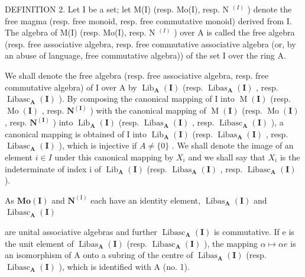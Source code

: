 DEFINITION 2. Let I be a set; let M(I) (resp. Mo(I), resp. N \(^{(I)}\) ) denote the free magma (resp. free monoid, resp. free commutative monoid) derived from I. The algebra of M(I) (resp. Mo(I), resp. N \(^{(I)}\) ) over A is called the free algebra (resp. free associative algebra, resp. free commutative associative algebra (or, by an abuse of language, free commutative algebra)) of the set I over the ring A.

We shall denote the free algebra (resp. free associative algebra, resp. free commutative algebra) of I over A by \(\operatorname{Lib}_{\mathbf{A}}(\mathbf{I})\) (resp. \(\operatorname{Libas}_{\mathbf{A}}(\mathbf{I})\) , resp. \(\operatorname{Libasc}_{\mathbf{A}}(\mathbf{I})\) ). By composing the canonical mapping of I into \(\operatorname{M}(\mathbf{I})\) (resp. \(\operatorname{Mo}(\mathbf{I})\) , resp. \(\mathbf{N}^{(\mathbf{I})}\) ) with the canonical mapping of \(\operatorname{M}(\mathbf{I})\) (resp. \(\operatorname{Mo}(\mathbf{I})\) , resp. \(\mathbf{N}^{(\mathbf{I})}\) ) into \(\operatorname{Lib}_{\mathbf{A}}(\mathbf{I})\) (resp. \(\operatorname{Libas}_{\mathbf{A}}(\mathbf{I})\) , resp. \(\operatorname{Libasc}_{\mathbf{A}}(\mathbf{I})\) ), a canonical mapping is obtained of I into \(\operatorname{Lib}_{\mathbf{A}}(\mathbf{I})\) (resp. \(\operatorname{Libas}_{\mathbf{A}}(\mathbf{I})\) , resp. \(\operatorname{Libasc}_{\mathbf{A}}(\mathbf{I})\) ), which is injective if \(A \neq \{0\}\) . We shall denote the image of an element \(i \in I\) under this canonical mapping by \(X_{i}\) and we shall say that \(X_{i}\) is the indeterminate of index i of \(\operatorname{Lib}_{\mathbf{A}}(\mathbf{I})\) (resp. \(\operatorname{Libas}_{\mathbf{A}}(\mathbf{I})\) , resp. \(\operatorname{Libasc}_{\mathbf{A}}(\mathbf{I})\) ).

As \(\mathbf{Mo}(\mathbf{I})\) and \(\mathbf{N}^{(\mathrm{I})}\) each have an identity element, \(\operatorname{Libas}_{\mathbf{A}}(\mathbf{I})\) and \(\operatorname{Libasc}_{\mathbf{A}}(\mathbf{I})\)

are unital associative algebras and further \(\operatorname{Libasc}_{\mathbf{A}}(\mathbf{I})\) is commutative. If e is the unit element of \(\operatorname{Libas}_{\mathbf{A}}(\mathbf{I})\) (resp. \(\operatorname{Libasc}_{\mathbf{A}}(\mathbf{I})\) ), the mapping \(\alpha \mapsto \alpha e\) is an isomorphism of A onto a subring of the centre of \(\operatorname{Libas}_{\mathbf{A}}(\mathbf{I})\) (resp. \(\operatorname{Libasc}_{\mathbf{A}}(\mathbf{I})\) ), which is identified with A (no. 1).

